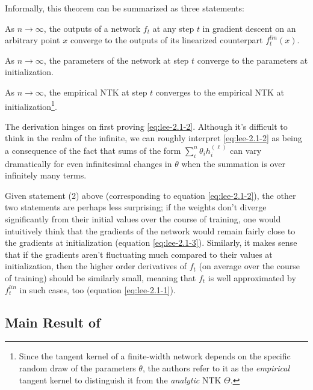 \documentclass{article}
\begin{document}
Informally, this theorem can be summarized as three statements:
\begin{compactenum}
	\item As $n \to \infty$, the outputs of a network $f_t$ at any step $t$ in gradient descent on an arbitrary point $x$  converge to the outputs of its linearized counterpart $f^{lin}_t(x)$. 
	
	\item As $n \to \infty$, the parameters of the network at step $t$ converge to the parameters at initialization. 
	
	\item As $n \to \infty$, the empirical NTK at step $t$ converges to the empirical NTK at initialization\footnote{Since the tangent kernel of a finite-width network depends on the specific random draw of the parameters $\theta$, the authors refer to it as the \textit{empirical} tangent kernel to distinguish it from the \textit{analytic} NTK $\Theta$.}.
\end{compactenum}

The derivation hinges on first proving \ref{eq:lee-2.1-2}. Although it's difficult to think in the realm of the infinite, we can roughly interpret \ref{eq:lee-2.1-2} as being a consequence of the fact that sums of the form $\sum_i^{n} \theta_i h^{(\ell)}_i$ can vary dramatically for even infinitesimal changes in $\theta$ when the summation is over infinitely many terms.


Given statement (2) above (corresponding to equation \ref{eq:lee-2.1-2}), the other two statements are perhaps less surprising; if the weights don't diverge significantly from their initial values over the course of training, one would intuitively think that the gradients of the network would remain fairly close to the gradients at initialization (equation \ref{eq:lee-2.1-3}). Similarly, it makes sense that if the gradients aren't fluctuating much compared to their values at initialization, then the higher order derivatives of $f_t$ (on average over the course of training) should be similarly small, meaning that $f_t$ is well approximated by $f^{lin}_t$ in such cases, too (equation \ref{eq:lee-2.1-1}).


\subsection{Main Result of \cite{simon2021}}
\end{document}
